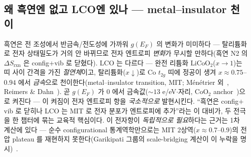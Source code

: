 \documentclass[11pt,a4paper]{article}
\newcommand{\rxn}{\mathrm{rxn}}
\begin{document}
\subsection{왜 흑연엔 없고 LCO엔 있나 — metal--insulator 천이}
흑연은 전 조성에서 반금속/전도성에 가까워 $g(E_F)$ 의 변화가 미미하다 — 탈리튬화로 전자 상태밀도가 거의 안 바뀌므로
전자 엔트로피 \emph{변화}가 무시할 만하다(흑연 N2 의 $\Delta S_\rxn$ 은 config$+$vib 로 닫혔다). LCO 는 다르다 —
완전 리튬화 LiCoO$_2$($x\!\to\!1$)는 띠 사이 간격을 가진 \emph{절연체}이고, 탈리튬화($x\!\downarrow$)로 Co $t_{2g}$
띠에 정공이 생겨 $x\approx0.75$--$0.94$ 에서 \emph{금속}으로 천이한다(metal--insulator transition, MIT;
M{\'e}n{\'e}trier 외~\cite{menetrier1999}, Reimers \& Dahn~\cite{reimers1992}). 곧 $g(E_F)$ 가 $0$ 에서
금속값($\sim13$ e/eV$\cdot$자리, CoO$_2$ anchor~\cite{motohashi2009})으로 켜진다 —
이 켜짐이 전자 엔트로피 항을 \emph{국소적으로} 발현시킨다. ``흑연은 config$+$vib 로 닫히나 LCO 는 MIT 로 전자 분포가
엔트로피에 추가''라는 이 대비가, 두 전극을 한 챕터에 묶는 교육적 핵심이다. 이 전자항이 \emph{독립적으로 필요}하다는
근거는 1차 계산에 있다 — 순수 configurational 통계역학만으로는 MIT 2상역($x\approx0.7$--$0.9$)의 전압 plateau 를
재현하지 못한다(Garikipati 그룹의 scale-bridging 계산이 이 누락을 명시)~\cite{ml2024}.
\end{document}
